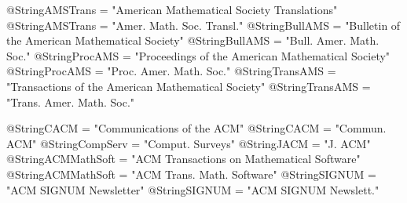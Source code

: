 


 @String{AMSTrans = "American Mathematical Society Translations" }
 @String{AMSTrans = "Amer. Math. Soc. Transl." }
 @String{BullAMS = "Bulletin of the American Mathematical Society" }
 @String{BullAMS = "Bull. Amer. Math. Soc." }
 @String{ProcAMS = "Proceedings of the American Mathematical Society" }
 @String{ProcAMS = "Proc. Amer. Math. Soc." }
 @String{TransAMS = "Transactions of the American Mathematical Society" }
 @String{TransAMS = "Trans. Amer. Math. Soc." }

 @String{CACM = "Communications of the {ACM}" }
 @String{CACM = "Commun. {ACM}" }
 @String{CompServ = "Comput. Surveys" }
 @String{JACM = "J. ACM" }
 @String{ACMMathSoft = "{ACM} Transactions on Mathematical Software" }
 @String{ACMMathSoft = "{ACM} Trans. Math. Software" }
 @String{SIGNUM = "{ACM} {SIGNUM} Newsletter" }
 @String{SIGNUM = "{ACM} {SIGNUM} Newslett." }

